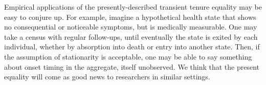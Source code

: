 \documentclass[12pt,oneside,a4paper]{article} %
\theoremstyle{definition}
\begin{document}
Empirical applications of the presently-described transient tenure equality may
be easy to conjure up. For example, imagine a hypothetical health state that
shows no consequential or noticeable symptoms, but is medically measurable. One
may take a census with regular follow-ups, until eventually the state is exited
by each individual, whether by absorption into death or entry into another
state. Then, if the assumption of stationarity is acceptable, one may be able to
say something about onset timing in the aggregate, itself unobserved. We think
that the present equality will come as good news to researchers in similar
settings.


  
\end{document}

